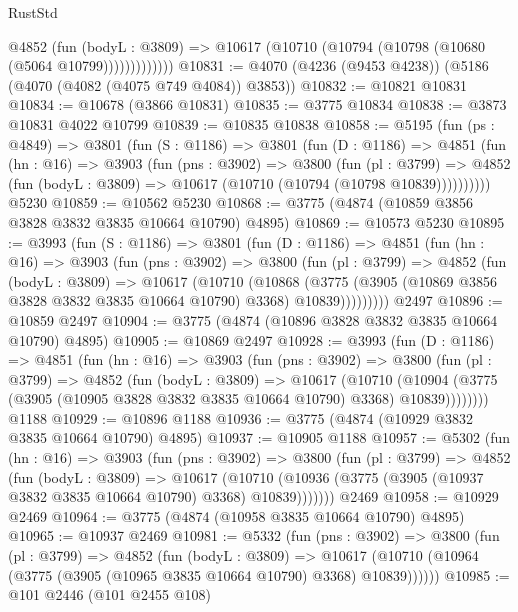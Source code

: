 \begin{lexlean}{RustStd}
\begin{coremodule}
                @4852
                  (fun (bodyL : @3809) =>
                  @10617 (@10710 (@10794 (@10798 (@10680 (@5064 @10799)))))))))))))
@10831 := @4070 (@4236 (@9453 @4238)) (@5186 (@4070 (@4082 (@4075 @749 @4084)) @3853))
@10832 := @10821 @10831
@10834 := @10678 (@3866 @10831)
@10835 := @3775 @10834
@10838 := @3873 @10831 @4022 @10799
@10839 := @10835 @10838
@10858 := @5195
    (fun (ps : @4849) =>
    @3801
      (fun (S : @1186) =>
      @3801
        (fun (D : @1186) =>
        @4851
          (fun (hn : @16) =>
          @3903
            (fun (pns : @3902) =>
            @3800
              (fun (pl : @3799) =>
              @4852 (fun (bodyL : @3809) => @10617 (@10710 (@10794 (@10798 @10839))))))))))
    @5230
@10859 := @10562 @5230
@10868 := @3775 (@4874 (@10859 @3856 @3828 @3832 @3835 @10664 @10790) @4895)
@10869 := @10573 @5230
@10895 := @3993
    (fun (S : @1186) =>
    @3801
      (fun (D : @1186) =>
      @4851
        (fun (hn : @16) =>
        @3903
          (fun (pns : @3902) =>
          @3800
            (fun (pl : @3799) =>
            @4852
              (fun (bodyL : @3809) =>
              @10617
                (@10710
                  (@10868
                    (@3775
                      (@3905 (@10869 @3856 @3828 @3832 @3835 @10664 @10790) @3368)
                      @10839)))))))))
    @2497
@10896 := @10859 @2497
@10904 := @3775 (@4874 (@10896 @3828 @3832 @3835 @10664 @10790) @4895)
@10905 := @10869 @2497
@10928 := @3993
    (fun (D : @1186) =>
    @4851
      (fun (hn : @16) =>
      @3903
        (fun (pns : @3902) =>
        @3800
          (fun (pl : @3799) =>
          @4852
            (fun (bodyL : @3809) =>
            @10617
              (@10710
                (@10904 (@3775 (@3905 (@10905 @3828 @3832 @3835 @10664 @10790) @3368) @10839))))))))
    @1188
@10929 := @10896 @1188
@10936 := @3775 (@4874 (@10929 @3832 @3835 @10664 @10790) @4895)
@10937 := @10905 @1188
@10957 := @5302
    (fun (hn : @16) =>
    @3903
      (fun (pns : @3902) =>
      @3800
        (fun (pl : @3799) =>
        @4852
          (fun (bodyL : @3809) =>
          @10617
            (@10710 (@10936 (@3775 (@3905 (@10937 @3832 @3835 @10664 @10790) @3368) @10839)))))))
    @2469
@10958 := @10929 @2469
@10964 := @3775 (@4874 (@10958 @3835 @10664 @10790) @4895)
@10965 := @10937 @2469
@10981 := @5332
    (fun (pns : @3902) =>
    @3800
      (fun (pl : @3799) =>
      @4852
        (fun (bodyL : @3809) =>
        @10617 (@10710 (@10964 (@3775 (@3905 (@10965 @3835 @10664 @10790) @3368) @10839))))))
@10985 := @101 @2446 (@101 @2455 @108)

\end{coremodule}
\end{lexlean}
